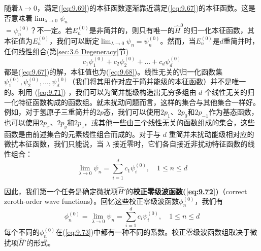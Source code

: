     随着$\lambda \to 0$，满足(\ref{eq:9.69})的本征函数逐渐靠近满足(\ref{eq:9.67})的本征函数。这是否意味着$\lim_{\lambda \to 0} \psi_n $\\$= \psi_n^{\left(0\right)}$？不一定。若$E_n^{\left(0\right)}$是非简并的，则只有唯一的$\hat{H}^0$的归一化本征函数，其本征值为$E_n^{\left(0\right)}$，我们可以断定$\lim_{\lambda \to 0} \psi_n = \psi_n^{\left(0\right)}$。然而，当$E_n^{\left(0\right)}$是$d$重简并时，任何线性组合(第\ref{sec:3.6 Degeneracy}节)
    \begin{equation}
        c_1\psi_1^{\left(0\right)} + c_2\psi_2^{\left(0\right)} + \ldots + c_d\psi_d^{\left(0\right)}
        \label{eq:9.71}
    \end{equation}
    都是(\ref{eq:9.67})的解，本征值也为(\ref{eq:9.68})。线性无关的归一化函数集 $\psi_1^{\left(0\right)}, \psi_2^{\left(0\right)},\ldots,\psi_d^{\left(0\right)}$（我们将其用作对应于简并能级的本征函数）并不是唯一的。利用 (\ref{eq:9.71}) ，我们可以为简并能级构造出无穷多组由 $d$ 个线性无关的归一化特征函数构成的函数组。就未扰动问题而言，这样的集合与其他集合一样好。例如，对于氢原子三重简并的$2p$态，我们可以使用$2p_1$、$2p_0$和$2p_{-1}$作为基态函数，也可以使用$2p_x$、$2p_y$和$2p_z$，或其他一些由三个线性无关的函数组成的集合，这些函数是由前述集合的元素线性组合而成的。对于与 $d$ 重简并未扰动能级相对应的微扰本征函数，我们只能说，当 $\lambda$ 接近零时，它们各自接近非扰动特征函数的线性组合：
    \begin{equation}
        \lim_{\lambda \to 0} \psi_n = \sum_{i=1}^{d}c_1\psi_i^{\left(0\right)}, \quad 1 \leq n \leq d
        \label{eq:9.72}
    \end{equation}

    因此，我们第一个任务是确定微扰项$\hat{H}'$的\textbf{校正零级波函数(\ref{eq:9.72})}（correct zeroth-order wave functions）。回忆这些校正零级波函数$\phi_n^{\left(0\right)}$，我们有
    \begin{equation}
        \phi_n^{\left(0\right)} = \lim_{\lambda \to 0} \psi_n = \sum_{i=1}^{d}c_i\psi_i^{\left(0\right)}, \quad 1 \leq n \leq d
        \label{eq:9.73}
    \end{equation}
    每个不同的$\phi_n^{\left(0\right)}$在(\ref{eq:9.73})中都有一种不同的系数。校正零级波函数组取决于微扰项$\hat{H}'$的形式。

